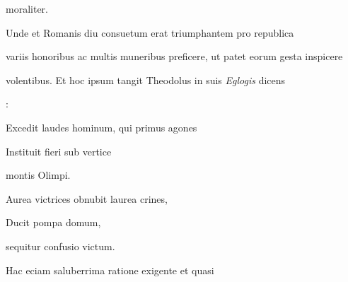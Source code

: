 

\renewcommand{\theFancyVerbLine}{\textcolor{green}{03-11\alph{FancyVerbLine}}}
\begin{VerbatimLatin}[firstnumber=1]
moraliter. 

\indentK Unde et Romanis diu consuetum erat triumphantem pro republica
\end{VerbatimLatin}

\renewcommand{\theFancyVerbLine}{03-\arabic{FancyVerbLine}\phantom{a}}

\begin{VerbatimLatin}[firstnumber=12]
variis honoribus ac multis muneribus preficere, ut patet eorum gesta inspicere

volentibus. Et hoc ipsum tangit Theodolus in suis \textit{Eglogis} dicens
\end{VerbatimLatin}

\renewcommand{\theFancyVerbLine}{\textcolor{green}{03-14\alph{FancyVerbLine}}}


\begin{VerbatimLatin}[firstnumber=1]
: 

\indentKcyt Excedit laudes hominum, qui primus agones

\indentKcyt Instituit fieri sub vertice
\end{VerbatimLatin}


\renewcommand{\theFancyVerbLine}{\textcolor{green}{03-15\alph{FancyVerbLine}}}

\begin{VerbatimLatin}[firstnumber=1]
\indentKcyt \phantom{Instituit fieri sub vertice }montis Olimpi.	

\indentKcyt Aurea victrices obnubit laurea crines,

\indentKcyt Ducit pompa domum,
\end{VerbatimLatin}

\renewcommand{\theFancyVerbLine}{\textcolor{green}{03-16\alph{FancyVerbLine}}}

\begin{VerbatimLatin}[firstnumber=1]
\indentKcyt \phantom{Ducit pompa domum, }sequitur confusio victum.

\indentK Hac eciam saluberrima ratione exigente et quasi
\end{VerbatimLatin}

